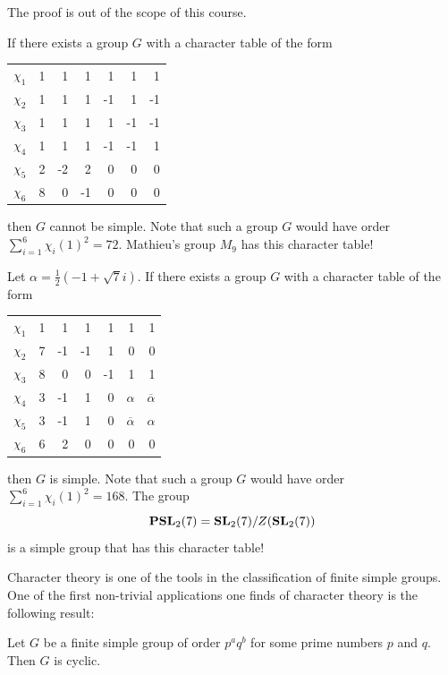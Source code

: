 The proof is out of the scope of this course. 

\begin{example}
    If there exists a group $G$ with
    a character table 
    of the form
    \begin{center}
		\begin{tabular}{|c|rrrrrr|}
			\hline
			$\chi_{1}$ & 1 & 1 & 1 & 1 & 1 & 1\tabularnewline
			$\chi_{2}$ & 1 & 1 & 1 & -1 & 1 & -1 \tabularnewline
			$\chi_{3}$ & 1 & 1 & 1 & 1 & -1 & -1\tabularnewline
		    $\chi_{4}$ & 1 & 1 & 1 & -1 & -1 & 1\tabularnewline
			$\chi_{5}$ & 2 & -2 & 2 & 0 & 0 & 0\tabularnewline
			$\chi_{6}$ & 8 & 0 & -1 & 0 & 0 & 0\tabularnewline
			\hline
		\end{tabular}
	\end{center}
	then $G$ cannot be simple. Note that such a group $G$ would have order $\sum_{i=1}^6\chi_i(1)^2=72$. 
	Mathieu's group $M_{9}$ has this character table! 
\end{example}

\begin{example}
    Let $\alpha=\frac{1}{2}(-1+\sqrt{7}i)$. 
    If there exists a group $G$ with a character table
    of the form
    \begin{center}
		\begin{tabular}{|c|rrrrrr|}
			\hline
			$\chi_{1}$ & 1 & 1 & 1 & 1 & 1 & 1\tabularnewline
			$\chi_{2}$ & 7 & -1 & -1 & 1 & 0 & 0 \tabularnewline
			$\chi_{3}$ & 8 & 0 & 0 & -1 & 1 & 1\tabularnewline
		    $\chi_{4}$ & 3 & -1 & 1 & 0 & $\alpha$ & $\overline{\alpha}$ \tabularnewline
			$\chi_{5}$ & 3 & -1 & 1 & 0 & $\overline{\alpha}$ & $\alpha$\tabularnewline
			$\chi_{6}$ & 6 & 2 & 0 & 0 & 0 & 0\tabularnewline
			\hline
		\end{tabular}
	\end{center}    
	then $G$ is simple. Note that such a 
        group $G$ would have order 
	$\sum_{i=1}^6\chi_i(1)^2=168$. 
	The group  
	\[
	\mathbf{PSL}_2(7)=\mathbf{SL}_2(7)/Z(\mathbf{SL}_2(7))
	\]
	is a simple group that has this character table!  
\end{example}

Character theory is one of the tools in the 
classification of finite simple groups. 
One of the first non-trivial applications
one finds of character theory is 
the following result:

\begin{theorem}[Burnside]
    Let $G$ be a finite simple group of order $p^aq^b$ for some
    prime numbers $p$ and $q$. Then $G$ is cyclic. 
\end{theorem}

